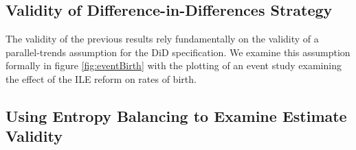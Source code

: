 \documentclass[a4paper,11pt]{article}
\begin{document}
\begin{spacing}{1.5}
\subsection{Validity of Difference-in-Differences Strategy}\label{parallel}
The validity of the previous results rely fundamentally on the validity of a parallel-trends assumption for the DiD specification.  We examine this assumption formally in figure \ref{fig:eventBirth} with the plotting of an event study examining the effect of the ILE reform on rates of birth.


\subsection{Using Entropy Balancing to Examine Estimate Validity}\label{entropy}



\end{spacing}
\end{document}
